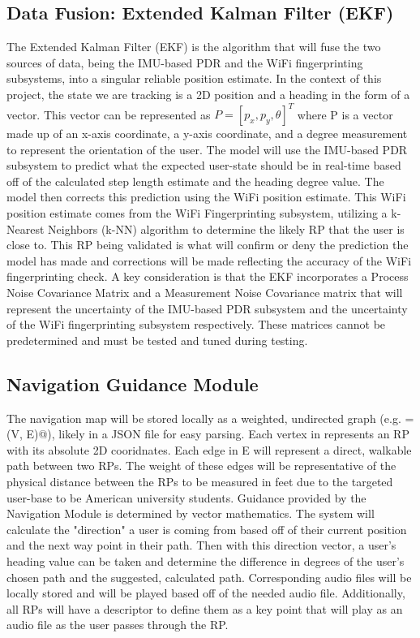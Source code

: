 \documentclass{article}
\begin{document}
\subsection{Data Fusion: Extended Kalman Filter (EKF)}
The Extended Kalman Filter (EKF) is the algorithm that will fuse the two sources of data, being the IMU-based PDR and the WiFi fingerprinting subsystems, into a singular reliable position estimate. In the context of this project, the state we are tracking is a 2D position and a heading in the form of a vector. This vector can be represented as $P=[p_x,p_y, \theta]^T$ where P is a vector made up of an x-axis coordinate, a y-axis coordinate, and a degree measurement to represent the orientation of the user. The model will use the IMU-based PDR subsystem to predict what the expected user-state should be in real-time based off of the calculated step length estimate and the heading degree value. The model then corrects this prediction using the WiFi position estimate. This WiFi position estimate comes from the WiFi Fingerprinting subsystem, utilizing a k-Nearest Neighbors (k-NN) algorithm to determine the likely RP that the user is close to. This RP being validated is what will confirm or deny the prediction the model has made and corrections will be made reflecting the accuracy of the WiFi fingerprinting check. A key consideration is that the EKF incorporates a Process Noise Covariance Matrix and a Measurement Noise Covariance matrix that will represent the uncertainty of the IMU-based PDR subsystem and the uncertainty of the WiFi fingerprinting subsystem respectively. These matrices cannot be predetermined and must be tested and tuned during testing.

\subsection{Navigation Guidance Module}
The navigation map will be stored locally as a weighted, undirected graph (e.g. \verb@G = (V, E)@), likely in a JSON file for easy parsing. Each vertex in \verb@V@ represents an RP with its absolute 2D cooridnates. Each edge in E will represent a direct, walkable path between two RPs. The weight of these edges will be representative of the physical distance between the RPs to be measured in feet due to the targeted user-base to be American university students. Guidance provided by the Navigation Module is determined by vector mathematics. The system will calculate the "direction" a user is coming from based off of their current position and the next way point in their path. Then with this direction vector, a user's heading value can be taken and determine the difference in degrees of the user's chosen path and the suggested, calculated path. Corresponding audio files will be locally stored and will be played based off of the needed audio file. Additionally, all RPs will have a descriptor to define them as a key point that will play as an audio file as the user passes through the RP.
\end{document}
